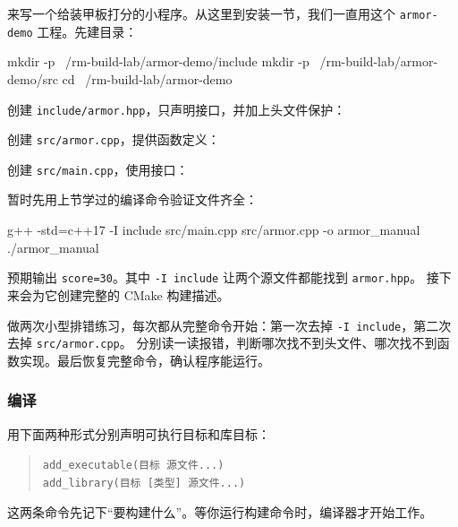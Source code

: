 \begin{example}[为装甲板程序准备三个文件]
\label{ex:armor-sources}
来写一个给装甲板打分的小程序。从这里到安装一节，我们一直用这个 \texttt{armor-demo} 工程。先建目录：
\begin{tbash}
mkdir -p ~/rm-build-lab/armor-demo/include
mkdir -p ~/rm-build-lab/armor-demo/src
cd ~/rm-build-lab/armor-demo
\end{tbash}
创建 \texttt{include/armor.hpp}，只声明接口，并加上头文件保护：


创建 \texttt{src/armor.cpp}，提供函数定义：


创建 \texttt{src/main.cpp}，使用接口：


暂时先用上节学过的编译命令验证文件齐全：
\begin{tbash}
g++ -std=c++17 -I include src/main.cpp src/armor.cpp -o armor_manual
./armor_manual
\end{tbash}
预期输出 \texttt{score=30}。其中 \texttt{-I include} 让两个源文件都能找到 \texttt{armor.hpp}。
接下来会为它创建完整的 CMake 构建描述。
\end{example}

\begin{exercise}\label{ex:v1-build-missing-files}
做两次小型排错练习，每次都从完整命令开始：第一次去掉 \texttt{-I include}，第二次去掉 \texttt{src/armor.cpp}。
分别读一读报错，判断哪次找不到头文件、哪次找不到函数实现。最后恢复完整命令，确认程序能运行。
\end{exercise}

\subsubsection{编译}
\label{sec:cmake-build}

用下面两种形式分别声明可执行目标和库目标：
\begin{quote}
\texttt{add\_executable(目标 源文件...)}\\
\texttt{add\_library(目标 [类型] 源文件...)}
\end{quote}
这两条命令先记下“要构建什么”。等你运行构建命令时，编译器才开始工作。

